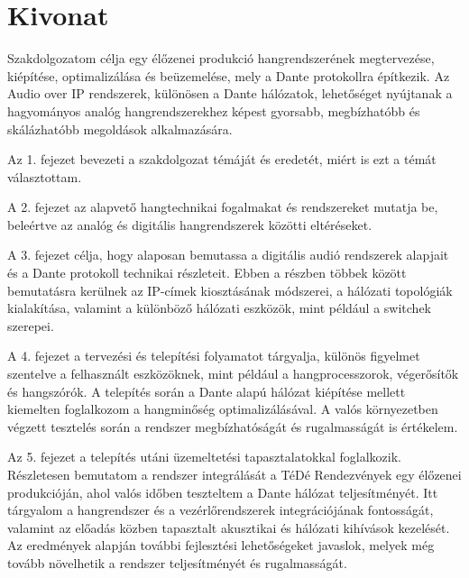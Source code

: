 \setcounter{page}{1}

\selecthungarian

\chapter*{Kivonat}

Szakdolgozatom célja egy élőzenei produkció hangrendszerének megtervezése, 
kiépítése, optimalizálása és beüzemelése, mely a Dante protokollra 
építkezik. Az Audio over IP rendszerek, különösen a Dante hálózatok, 
lehetőséget nyújtanak a hagyományos analóg hangrendszerekhez 
képest gyorsabb, megbízhatóbb és skálázhatóbb megoldások alkalmazására. 

Az 1. fejezet bevezeti a szakdolgozat témáját és eredetét,
miért is ezt a témát választottam.

A 2. fejezet az alapvető hangtechnikai fogalmakat és rendszereket 
mutatja be, beleértve az analóg és digitális hangrendszerek 
közötti eltéréseket. 

A 3. fejezet célja, hogy alaposan bemutassa a digitális audió 
rendszerek alapjait és a Dante protokoll technikai részleteit. 
Ebben a részben többek között bemutatásra kerülnek az IP-címek kiosztásának módszerei, 
a hálózati topológiák kialakítása, 
valamint a különböző hálózati eszközök, mint például a switchek szerepei.

A 4. fejezet a tervezési és telepítési folyamatot tárgyalja, 
különös figyelmet szentelve a felhasznált eszközöknek, 
mint például a hangprocesszorok, végerősítők és 
hangszórók. 
A telepítés során a Dante alapú hálózat  kiépítése mellett kiemelten
foglalkozom a hangminőség optimalizálásával. A valós környezetben 
végzett tesztelés során a rendszer megbízhatóságát és 
rugalmasságát is értékelem.

Az 5. fejezet a telepítés utáni üzemeltetési tapasztalatokkal 
foglalkozik. Részletesen bemutatom a rendszer integrálását a 
TéDé Rendezvények egy élőzenei produkcióján, ahol 
valós időben teszteltem a Dante hálózat teljesítményét. 
Itt tárgyalom a hangrendszer és a vezérlőrendszerek 
integrációjának fontosságát, valamint az előadás közben 
tapasztalt akusztikai és hálózati kihívások kezelését. 
Az eredmények alapján további fejlesztési lehetőségeket 
javaslok, melyek még tovább növelhetik a rendszer teljesítményét és rugalmasságát.

